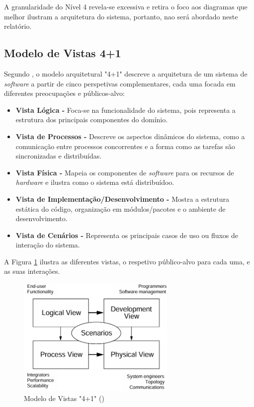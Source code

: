 A granularidade do Nível 4 revela-se excessiva e retira o foco aos diagramas que melhor ilustram a arquitetura do sistema, portanto, nao será abordado neste relatório.

\subsection{Modelo de Vistas 4+1}
\label{subsec:model4plus1}

Segundo \cite{Kruchten1995}, o modelo arquitetural "4+1" descreve a arquitetura de um sistema de \textit{software} a partir de cinco perspetivas complementares, cada uma focada em diferentes preocupações e públicos-alvo:

\begin{itemize}
\item \textbf{Vista Lógica -} Foca-se na funcionalidade do sistema, pois representa a estrutura dos principais componentes do domínio.

\item \textbf{Vista de Processos -} Descreve os aspectos dinâmicos do sistema, como a comunicação entre processos concorrentes e a forma como as tarefas são sincronizadas e distribuídas.

\item \textbf{Vista Física -} Mapeia os componentes de \textit{software} para os recursos de \textit{hardware} e ilustra como o sistema está distribuídoo.

\item \textbf{Vista de Implementação/Desenvolvimento -} Mostra a estrutura estática do código, organização em módulos/pacotes e o ambiente de desenvolvimento.

\item \textbf{Vista de Cenários -} Representa os principais casos de uso ou fluxos de interação do sistema.
\end{itemize}

A Figura \ref{fig:41viewmodel} ilustra as diferentes vistas, o respetivo público-alvo para cada uma, e as suas interações.

\begin{figure}[H]
    \centering
    \includegraphics[width=3in,keepaspectratio]{frontmatter/assets/models/4+1views.png}
    \caption{Modelo de Vistas "4+1" (\cite{Kruchten1995})}
    \label{fig:41viewmodel}
\end{figure}

